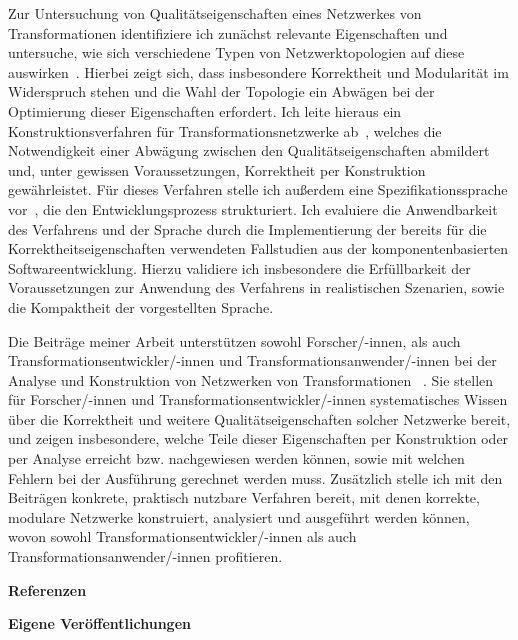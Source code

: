 \documentclass[a4paper,deutsch,CS,11pt,unnummeriert]{KITbrief}
\newcommand\owncite[2][]{%
    \cite[#1]{#2}%
    \addtocategory{ownpublications}{#2}%
}
\begin{document}
Zur Untersuchung von Qualitätseigenschaften eines Netzwerkes von Transformationen identifiziere ich zunächst relevante Eigenschaften und untersuche, wie sich verschiedene Typen von Netzwerktopologien auf diese auswirken~\cite{klare2018docsym}.
Hierbei zeigt sich, dass insbesondere Korrektheit und Modularität im Widerspruch stehen und die Wahl der Topologie ein Abwägen bei der Optimierung dieser Eigenschaften erfordert.
Ich leite hieraus ein Konstruktionsverfahren für Transformationsnetzwerke ab~\cite{klare2019models}, welches die Notwendigkeit einer Abwägung zwischen den Qualitätseigenschaften abmildert und, unter gewissen Voraussetzungen, Korrektheit per Konstruktion gewährleistet. %
Für dieses Verfahren stelle ich außerdem eine Spezifikationssprache vor~\cite{klare2019models}, die den Entwicklungsprozess strukturiert.
Ich evaluiere die Anwendbarkeit des Verfahrens und der Sprache durch die Implementierung der bereits für die Korrektheitseigenschaften verwendeten Fallstudien aus der komponentenbasierten Softwareentwicklung. 
Hierzu validiere ich insbesondere die Erfüllbarkeit der Voraussetzungen zur Anwendung des Verfahrens in realistischen Szenarien, sowie die Kompaktheit der vorgestellten Sprache.

Die Beiträge meiner Arbeit unterstützen sowohl Forscher/-innen, als auch Transformationsentwickler/-innen und Transformationsanwender/-innen bei der Analyse und Konstruktion von Netzwerken von Transformationen~\owncite{klare2019dagstuhl}.
Sie stellen für Forscher/-innen und Transformationsentwickler/-innen systematisches Wissen über die Korrektheit und weitere Qualitätseigenschaften solcher Netzwerke bereit, und zeigen insbesondere, welche Teile dieser Eigenschaften per Konstruktion oder per Analyse erreicht bzw. nachgewiesen werden können, sowie mit welchen Fehlern bei der Ausführung gerechnet werden muss.
Zusätzlich stelle ich mit den Beiträgen konkrete, praktisch nutzbare Verfahren bereit, mit denen korrekte, modulare Netzwerke konstruiert, analysiert und ausgeführt werden können, wovon sowohl Transformationsentwickler/-innen als auch Transformationsanwender/-innen profitieren.

\clearpage
\textbf{Referenzen}
\setlength\bibitemsep{0.8ex} %
\printbibliography[title={Referenzen},heading=none,notcategory=ownpublications]

\textbf{Eigene Veröffentlichungen}
\printbibliography[title={Eigene Veröffentlichungen},heading=none,category=ownpublications]
\end{document}
